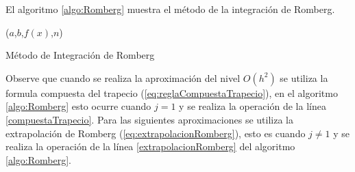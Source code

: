 El algoritmo \ref{algo:Romberg} muestra el método de la integración de Romberg.
\begin{algorithm}[ht]

	\Romberg($a$,$b$,$f(x)$,$n$) 
	\caption{Método de Integración de Romberg}
	\label{algo:Romberg}
\end{algorithm}

Observe que cuando se realiza la aproximación del nivel $O(h^2)$ se utiliza la formula compuesta del trapecio 
(\ref{eq:reglaCompuestaTrapecio}), en el algoritmo \ref{algo:Romberg} esto ocurre cuando $j=1$ y se realiza la operación de la línea 
\ref{compuestaTrapecio}. Para las siguientes aproximaciones se utiliza la extrapolación de Romberg (\ref{eq:extrapolacionRomberg}), 
esto es cuando $j\not=1$ y se realiza la operación de la línea \ref{extrapolacionRomberg} del algoritmo \ref{algo:Romberg}.\\

